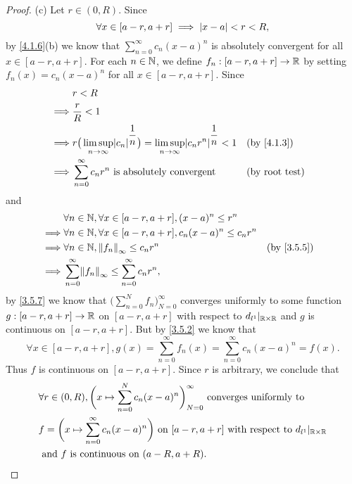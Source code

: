 \begin{proof}{(c)}
  Let \(r \in (0, R)\).
  Since
  \[
    \forall x \in [a - r, a + r] \implies \left\lvert x - a\right\rvert < r < R,
  \]
  by \cref{4.1.6}(b) we know that \(\sum_{n = 0}^\infty c_n (x - a)^n\) is absolutely convergent for all \(x \in [a - r, a + r]\).
  For each \(n \in \mathbb{N}\), we define \(f_n : [a - r, a + r] \to \mathbb{R}\) by setting \(f_n(x) = c_n (x - a)^n\) for all \(x \in [a - r, a + r]\).
  Since
  \begin{align*}
             & r < R                                                                                                                                               \\
    \implies & \dfrac{r}{R} < 1                                                                                                                                    \\
    \implies & r \big(\limsup_{n \to \infty} \abs{c_n}^{\dfrac{1}{n}}\big) = \limsup_{n \to \infty} \abs{c_n r^n}^{\dfrac{1}{n}} < 1 &  & \text{(by \cref{4.1.3})} \\
    \implies & \sum_{n = 0}^\infty c_n r^n \text{ is absolutely convergent}                                                          &  & \text{(by root test)}
  \end{align*}
  and
  \begin{align*}
             & \forall n \in \N, \forall x \in [a - r, a + r], (x - a)^n \leq r^n                                       \\
    \implies & \forall n \in \N, \forall x \in [a - r, a + r], c_n (x - a)^n \leq c_n r^n                               \\
    \implies & \forall n \in \N, \norm*{f_n}_\infty \leq c_n r^n                          &  & \text{(by \cref{3.5.5})} \\
    \implies & \sum_{n = 0}^\infty \norm*{f_n}_\infty \leq \sum_{n = 0}^\infty c_n r^n,
  \end{align*}
  by \cref{3.5.7} we know that \(\big(\sum_{n = 0}^N f_n\big)_{N = 0}^\infty\) converges uniformly to some function \(g : [a - r, a + r] \to \mathbb{R}\) on \([a - r, a + r]\) with respect to \(d_{l^1}|_{\mathbb{R} \times \mathbb{R}}\) and \(g\) is continuous on \([a - r, a + r]\).
  But by \cref{3.5.2} we know that
  \[
    \forall x \in [a - r, a + r], g(x) = \sum_{n = 0}^\infty f_n(x) = \sum_{n = 0}^\infty c_n (x - a)^n = f(x).
  \]
  Thus \(f\) is continuous on \([a - r, a + r]\).
  Since \(r\) is arbitrary, we conclude that
  \begin{align*}
     & \forall r \in (0, R), \bigg(x \mapsto \sum_{n = 0}^N c_n (x - a)^n\bigg)_{N = 0}^\infty \text{ converges uniformly to }                 \\
     & f = \bigg(x \mapsto \sum_{n = 0}^\infty c_n (x - a)^n\bigg) \text{ on } [a - r, a + r] \text{ with respect to } d_{l^1}|_{\mathbb{R} \times \mathbb{R}} \\
     & \text{ and } f \text{ is continuous on } (a - R, a + R).
  \end{align*}
\end{proof}

